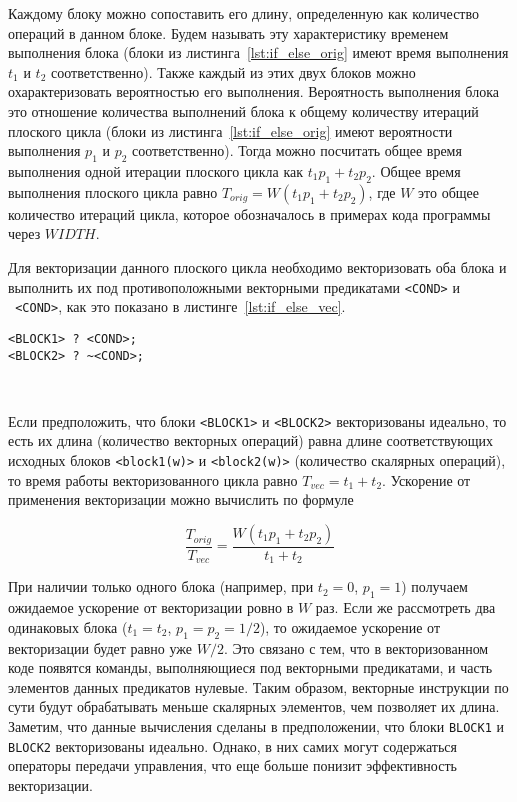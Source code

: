 \documentclass[
11pt,%
tightenlines,%
twoside,%
onecolumn,%
nofloats,%
nobibnotes,%
nofootinbib,%
superscriptaddress,%
noshowpacs,%
centertags]%
{revtex4}
\begin{document}
Каждому блоку можно сопоставить его длину, определенную как количество операций в данном блоке.
Будем называть эту характеристику временем выполнения блока (блоки из листинга~\ref{lst:if_else_orig} имеют время выполнения $t_1$ и $t_2$ соответственно).
Также каждый из этих двух блоков можно охарактеризовать вероятностью его выполнения.
Вероятность выполнения блока это отношение количества выполнений блока к общему количеству итераций плоского цикла (блоки из листинга~\ref{lst:if_else_orig} имеют вероятности выполнения $p_1$ и $p_2$ соответственно).
Тогда можно посчитать общее время выполнения одной итерации плоского цикла как $t_1 p_1 + t_2 p_2$.
Общее время выполнения плоского цикла равно $T_{orig} = W(t_1 p_1 + t_2 p_2)$, где $W$ это общее количество итераций цикла, которое обозначалось в примерах кода программы через $WIDTH$.

Для векторизации данного плоского цикла необходимо векторизовать оба блока и выполнить их под противоположными векторными предикатами \texttt{<COND>} и \texttt{~<COND>}, как это показано в листинге~\ref{lst:if_else_vec}.

\begin{lstlisting}[caption={Векторизованная конструкция \texttt{if-else}.},label={lst:if_else_vec}]
<BLOCK1> ? <COND>;
<BLOCK2> ? ~<COND>;
\end{lstlisting}

\

Если предположить, что блоки \texttt{<BLOCK1>} и \texttt{<BLOCK2>} векторизованы идеально, то есть их длина (количество векторных операций) равна длине соответствующих исходных блоков \texttt{<block1(w)>} и \texttt{<block2(w)>} (количество скалярных операций), то время работы векторизованного цикла равно $T_{vec} = t_1 + t_2$.
Ускорение от применения векторизации можно вычислить по формуле

\begin{equation}
\frac{T_{orig}}{T_{vec}} = \frac{W(t_1 p_1 + t_2 p_2)}{t_1 + t_2}
\end{equation}

При наличии только одного блока (например, при $t_2 = 0$, $p_1 = 1$) получаем ожидаемое ускорение от векторизации ровно в $W$ раз.
Если же рассмотреть два одинаковых блока ($t_1 = t_2$, $p_1 = p_2 = 1/2$), то ожидаемое ускорение от векторизации будет равно уже $W/2$.
Это связано с тем, что в векторизованном коде появятся команды, выполняющиеся под векторными предикатами, и часть элементов данных предикатов нулевые.
Таким образом, векторные инструкции по сути будут обрабатывать меньше скалярных элементов, чем позволяет их длина.
Заметим, что данные вычисления сделаны в предположении, что блоки \texttt{BLOCK1} и \texttt{BLOCK2} векторизованы идеально.
Однако, в них самих могут содержаться операторы передачи управления, что еще больше понизит эффективность векторизации.
\end{document}
